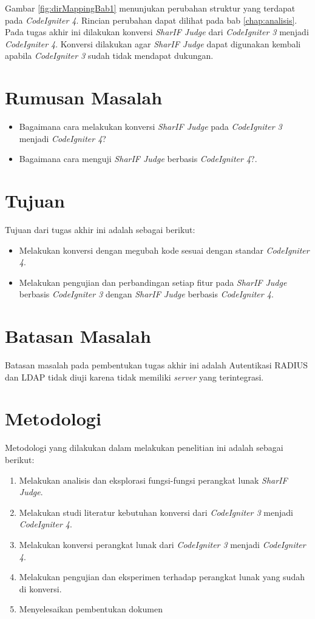 Gambar \ref{fig:dirMappingBab1} menunjukan perubahan struktur yang terdapat pada \textit{CodeIgniter 4}. Rincian perubahan dapat dilihat pada bab \ref{chap:analisis}. Pada tugas akhir ini dilakukan konversi \textit{SharIF Judge} dari \textit{CodeIgniter 3} menjadi \textit{CodeIgniter 4}. Konversi dilakukan agar \textit{SharIF Judge} dapat digunakan kembali apabila \textit{CodeIgniter 3} sudah tidak mendapat dukungan.

\section{Rumusan Masalah}
\label{sec:rumusan}
\begin{itemize}
	\item Bagaimana cara melakukan konversi \textit{SharIF Judge} pada \textit{CodeIgniter 3} menjadi \textit{CodeIgniter 4}? 
		\item Bagaimana cara menguji \textit{SharIF Judge} berbasis \textit{CodeIgniter 4}?.
\end{itemize}
\section{Tujuan}
\label{sec:tujuan}
Tujuan dari tugas akhir ini adalah sebagai berikut:
\begin{itemize}
	\item Melakukan konversi dengan megubah kode sesuai dengan standar \textit{CodeIgniter 4}.
	\item Melakukan pengujian dan perbandingan setiap fitur pada \textit{SharIF Judge} berbasis \textit{CodeIgniter 3} dengan \textit{SharIF Judge} berbasis \textit{CodeIgniter 4}.
\end{itemize}

\section{Batasan Masalah}
\label{sec:batasan}
Batasan masalah pada pembentukan tugas akhir ini adalah Autentikasi RADIUS dan LDAP tidak diuji karena tidak memiliki \textit{server} yang terintegrasi.

\section{Metodologi}
\label{sec:metlit}
Metodologi yang dilakukan dalam melakukan penelitian ini adalah sebagai berikut:
\begin{enumerate}
	\item Melakukan analisis dan eksplorasi fungsi-fungsi perangkat lunak \textit{SharIF Judge}.
	\item Melakukan studi literatur kebutuhan konversi dari \textit{CodeIgniter 3} menjadi \textit{CodeIgniter 4}.
	\item Melakukan konversi perangkat lunak dari \textit{CodeIgniter 3} menjadi \textit{CodeIgniter 4}.
	\item Melakukan pengujian dan eksperimen terhadap perangkat lunak yang sudah di konversi.
	\item Menyelesaikan pembentukan dokumen
\end{enumerate}

